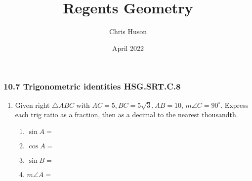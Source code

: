 \documentclass[12pt, twoside]{article}
\title{Regents Geometry}
\author{Chris Huson}
\date{April 2022}
\begin{document}
\subsubsection*{10.7 Trigonometric identities \hfill HSG.SRT.C.8}
\begin{enumerate}
\item Given right $\triangle ABC$ with $AC=5, BC=5 \sqrt{3}, AB=10$, $m\angle C=90^\circ$. Express each trig ratio as a fraction, then as a decimal to the nearest thousandth.
  \begin{multicols}{2}
    \begin{enumerate}[itemsep=0.2cm]
      \item $\sin A =$
      \item $\cos A =$
      \item $\sin B =$
      \item $m\angle A=$
    \end{enumerate}
    \begin{center}
    \end{center}
  \end{multicols} \vspace{1cm}


\end{enumerate}
\end{document}

